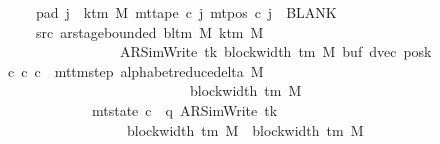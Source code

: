 \begin{isabellebody}
\ \ \ \ \ \ \ pad{}{\isacharcolon}{\kern0pt}\ {\isachardoublequoteopen}{\isasymforall}j\ {\isasymge}\ k{\isacharunderscore}{\kern0pt}tm\ M{\isachardot}{\kern0pt}\ mt{\isacharunderscore}{\kern0pt}tape\ c{}\ j\ {\isacharparenleft}{\kern0pt}mt{\isacharunderscore}{\kern0pt}pos\ c{}\ j{\isacharparenright}{\kern0pt}\ {\isacharequal}{\kern0pt}\ BLANK{}{\isachardoublequoteclose}\isanewline
\ \ \ \ \ \ \ src{}{\isacharcolon}{\kern0pt}\ {\isachardoublequoteopen}ar{\isacharunderscore}{\kern0pt}stage{\isacharunderscore}{\kern0pt}bounded\ {\isacharparenleft}{\kern0pt}bl{\isacharunderscore}{\kern0pt}tm\ M{\isacharparenright}{\kern0pt}\ {\isacharparenleft}{\kern0pt}k{\isacharunderscore}{\kern0pt}tm\ M{\isacharparenright}{\kern0pt}\isanewline
\ \ \ \ \ \ \ \ \ \ \ \ \ \ \ \ \ \ \ {\isacharparenleft}{\kern0pt}AR{\isacharunderscore}{\kern0pt}SimWrite{\isacharcomma}{\kern0pt}\ tk{\isacharcomma}{\kern0pt}\ block{\isacharunderscore}{\kern0pt}width\ {\isacharparenleft}{\kern0pt}{\isasymGamma}{\isacharunderscore}{\kern0pt}tm\ M{\isacharparenright}{\kern0pt}{\isacharcomma}{\kern0pt}\ buf{\isacharcomma}{\kern0pt}\ dvec{\isacharcomma}{\kern0pt}\ posk{\isacharparenright}{\kern0pt}{\isachardoublequoteclose}\isanewline
\ \ \ {\isachardoublequoteopen}{\isasymexists}c{\isacharprime}{\kern0pt}{\isachardot}{\kern0pt}\ {\isacharparenleft}{\kern0pt}c{}{\isacharcomma}{\kern0pt}\ c{\isacharprime}{\kern0pt}{\isacharparenright}{\kern0pt}\ {\isasymin}\ {\isacharparenleft}{\kern0pt}mttm{\isacharunderscore}{\kern0pt}step\ {\isacharparenleft}{\kern0pt}alphabet{\isacharunderscore}{\kern0pt}reduce{\isacharunderscore}{\kern0pt}delta\ M{\isacharparenright}{\kern0pt}{\isacharparenright}{\kern0pt}\isanewline
\ \ \ \ \ \ \ \ \ \ \ \ \ \ \ \ \ \ \ \ \ \ \ \ \ \ \ \ {\isacharcircum}{\kern0pt}{\isacharcircum}{\kern0pt}\ {\isacharparenleft}{\kern0pt}block{\isacharunderscore}{\kern0pt}width\ {\isacharparenleft}{\kern0pt}{\isasymGamma}{\isacharunderscore}{\kern0pt}tm\ M{\isacharparenright}{\kern0pt}\ {\isacharminus}{\kern0pt}\ {}{\isacharparenright}{\kern0pt}\isanewline
\ \ \ \ \ \ \ \ \ \ \ \ \ \ {\isasymand}\ mt{\isacharunderscore}{\kern0pt}state\ c{\isacharprime}{\kern0pt}\ {\isacharequal}{\kern0pt}\ {\isacharparenleft}{\kern0pt}q{\isacharcomma}{\kern0pt}\ AR{\isacharunderscore}{\kern0pt}SimWrite{\isacharcomma}{\kern0pt}\ tk{\isacharcomma}{\kern0pt}\isanewline
\ \ \ \ \ \ \ \ \ \ \ \ \ \ \ \ \ \ \ \ block{\isacharunderscore}{\kern0pt}width\ {\isacharparenleft}{\kern0pt}{\isasymGamma}{\isacharunderscore}{\kern0pt}tm\ M{\isacharparenright}{\kern0pt}\ {\isacharplus}{\kern0pt}\ {\isacharparenleft}{\kern0pt}block{\isacharunderscore}{\kern0pt}width\ {\isacharparenleft}{\kern0pt}{\isasymGamma}{\isacharunderscore}{\kern0pt}tm\ M{\isacharparenright}{\kern0pt}\ {\isacharminus}{\kern0pt}\ {}{\isacharparenright}{\kern0pt}{\isacharcomma}{\kern0pt}\isanewline

\end{isabellebody}
